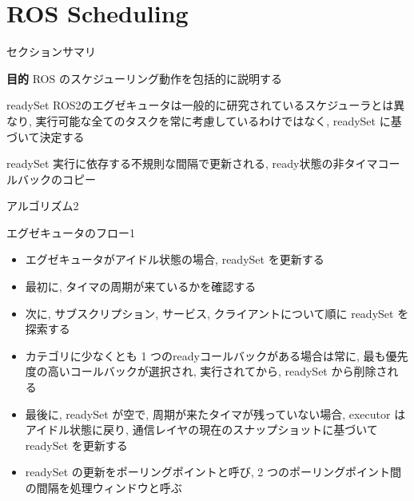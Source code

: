 
\section{ROS Scheduling}
\label{sec: ros scheduling}


\begin{frame}{セクションサマリ}
    \begin{itembox}[l]{\textbf{目的}}
        ROS のスケジューリング動作を包括的に説明する
    \end{itembox}
\end{frame}



\begin{frame}{readySet}
    ROS2のエグゼキュータは一般的に研究されているスケジューラとは異なり, 実行可能な全てのタスクを常に考慮しているわけではなく, readySet に基づいて決定する
    \begin{block}{readySet}
        実行に依存する不規則な間隔で更新される, ready状態の非タイマコールバックのコピー
    \end{block}
\end{frame}

\begin{frame}{アルゴリズム2}
\end{frame}

\begin{frame}{エグゼキュータのフロー1}
    \begin{itemize}
        \item エグゼキュータがアイドル状態の場合, readySet を更新する
        \item 最初に, タイマの周期が来ているかを確認する
        \item 次に, サブスクリプション, サービス, クライアントについて順に readySet を探索する
    \end{itemize}
\end{frame}

\begin{frame}{}
    \begin{itemize}
        \item カテゴリに少なくとも 1 つのreadyコールバックがある場合は常に, 最も優先度の高いコールバックが選択され, 実行されてから, readySet から削除される
        \item 最後に, readySet が空で, 周期が来たタイマが残っていない場合, executor はアイドル状態に戻り, 通信レイヤの現在のスナップショットに基づいて readySet を更新する
        \item readySet の更新をポーリングポイントと呼び, 2 つのポーリングポイント間の間隔を処理ウィンドウと呼ぶ
    \end{itemize}
\end{frame}

